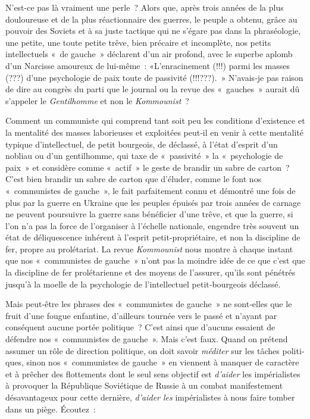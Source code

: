 \documentclass[french,twoside]{book} %
\begin{document}
\noindent N'est-ce pas là vraiment une perle ? Alors que, après trois années de la plus douloureuse et de la plus réactionnaire des guerres, le peuple a obtenu, grâce au pouvoir des Soviets et à sa juste tactique qui ne s’égare pas dans la phraséologie, une petite, une toute petite trêve, bien précaire et incomplète, nos petits intellectuels « de gauche » déclarent d’un air profond, avec le superbe aplomb d’un Narcisse amoureux de lui-même : «L'enracinement (!!!) parmi les masses (???) d’une psychologie de paix toute de passivité (!!!???). » N'avais‑je pas raison de dire au congrès du parti que le journal ou la revue des « gauches » aurait dû s’appeler le \emph{Gentilhomme} et non le \emph{Kommou­nist} ?\par
Comment un communiste qui comprend tant soit peu les conditions d’existence et la mentalité des masses labo­rieuses et exploitées peut‑il en venir à cette mentalité typi­que d’intellectuel, de petit bourgeois, de déclassé, à l’état d’esprit d’un nobliau ou d’un gentilhomme, qui taxe de « passivité » la « psychologie de paix » et considère comme « actif » le geste de brandir un sabre de carton ? C'est bien brandir un sabre de carton que d’éluder, comme le font nos « communistes de gauche », le fait par­faitement connu et démontré une fois de plus par la guerre en Ukraine que les peuples épuisés par trois années de car­nage ne peuvent poursuivre la guerre sans bénéficier d’une trêve, et que la guerre, si l’on n’a pas la force de l’organiser à l’échelle nationale, engendre très souvent un état de déliquescence inhérent à l’esprit petit-propriétaire, et non la discipline de fer, propre au prolétariat. La revue \emph{Kommounist} nous montre à chaque instant que nos « communistes de gauche » n’ont pas la moindre idée de ce que c’est que la discipline de fer prolétarienne et des moyens de l’assurer, qu’ils sont pénétrés jusqu’à la moelle de la psychologie de l’intellectuel petit‑bourgeois déclassé.\par
Mais peut‑être les phrases des « communistes de gauche » ne sont‑elles que le fruit d’une fougue enfantine, d’ailleurs tournée vers le passé et n’ayant par conséquent aucune portée politique ? C'est ainsi que d’aucuns essaient de défendre nos « communistes de gauche ». Mais c’est faux. Quand on prétend assumer un rôle de direc­tion politique, on doit savoir \emph{méditer} sur les tâches politi­ques, sinon nos « communistes de gauche » en viennent à manquer de caractère et à prêcher des flottements dont le seul sens objectif est \emph{d’aider} les impérialistes à provoquer la République Soviétique de Russie à un combat manifes­tement désavantageux pour cette dernière, \emph{d’aider les} impérialistes à nous faire tomber dans un piège. Écoutez :\par
\end{document}
